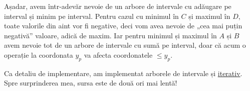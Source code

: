\documentclass[../main.tex]{subfiles}
\begin{document}
Așadar, avem într-adevăr nevoie de un arbore de intervale cu adăugare pe interval și minim pe interval. Pentru cazul cu minimul în $C$ și maximul în $D$, toate valorile din aint vor fi negative, deci vom avea nevoie de „cea mai puțin negativă” valoare, adică de maxim. Iar pentru minimul și maximul în $A$ și $B$ avem nevoie tot de un arbore de intervale cu sumă pe interval, doar că acum o operație la coordonata $y_p$ va afecta coordonatele $\leq y_p$.

Ca detaliu de implementare, am implementat arborele de intervale și \href{https://kilonova.ro/submissions/376728}{iterativ}. Spre surprinderea mea, sursa este de două ori mai lentă!
\end{document}
